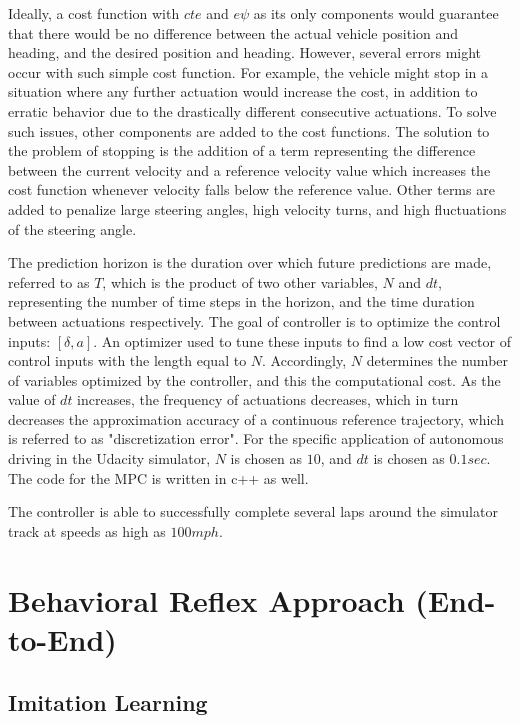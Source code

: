 Ideally, a cost function with \(cte\) and \(e\psi\) as its only components would guarantee that there would be no difference between the actual vehicle position and heading, and the desired position and heading. However, several errors might occur with such simple cost function. For example, the vehicle might stop in a situation where any further actuation would increase the cost, in addition to erratic behavior due to the drastically different consecutive actuations. To solve such issues, other components are added to the cost functions. The solution to the problem of stopping is the addition of a term representing the difference between the current velocity and a reference velocity value which increases the cost function whenever velocity falls below the reference value. Other terms are added to penalize large steering angles, high velocity turns, and high fluctuations of the steering angle.

The prediction horizon is the duration over which future predictions are made, referred to as \(T\), which is the product of two other variables, \(N\) and \(dt\), representing the number of time steps in the horizon, and the time duration between actuations respectively. The goal of controller is to optimize the control inputs: \([\delta, a]\). An optimizer \cite{ipopt} used to tune these inputs to find a low cost vector of control inputs with the length equal to \(N\). Accordingly, \(N\) determines the number of variables optimized by the controller, and this the computational cost. As the value of \(dt\) increases, the frequency of actuations decreases, which in turn decreases the approximation accuracy of a continuous reference trajectory, which is referred to as "discretization error". For the specific application of autonomous driving in the Udacity simulator, \(N\) is chosen as \(10\), and \(dt\) is chosen as \(0.1 sec\). The code for the MPC is written in c++ as well.

The controller is able to successfully complete several laps around the simulator track at speeds as high as \(100 mph\).


\chapter{Behavioral Reflex Approach (End-to-End)}
	\section{Imitation Learning}
